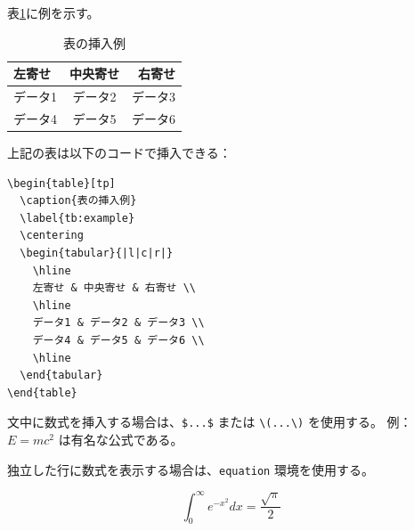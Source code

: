 表\ref{tb:example}に例を示す。

\begin{table}[tp]
  \caption{表の挿入例}
  \label{tb:example}
  \centering
  \begin{tabular}{|l|c|r|}
    \hline
    左寄せ & 中央寄せ & 右寄せ \\
    \hline
    データ1 & データ2 & データ3 \\
    データ4 & データ5 & データ6 \\
    \hline
  \end{tabular}
\end{table}

上記の表は以下のコードで挿入できる：

\begin{verbatim}
\begin{table}[tp]
  \caption{表の挿入例}
  \label{tb:example}
  \centering
  \begin{tabular}{|l|c|r|}
    \hline
    左寄せ & 中央寄せ & 右寄せ \\
    \hline
    データ1 & データ2 & データ3 \\
    データ4 & データ5 & データ6 \\
    \hline
  \end{tabular}
\end{table}
\end{verbatim}



文中に数式を挿入する場合は、\verb|$...$| または \verb|\(...\)| を使用する。
例：$E = mc^2$ は有名な公式である。


独立した行に数式を表示する場合は、\verb|equation| 環境を使用する。

\begin{equation}\label{eq:example}
  \int_0^\infty e^{-x^2} dx = \frac{\sqrt{\pi}}{2}
\end{equation}

